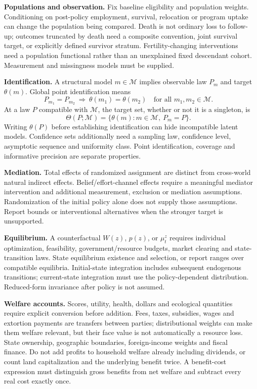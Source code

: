 \documentclass[11pt,a4paper]{article}
\begin{document}
\textbf{Populations and observation.} Fix baseline eligibility and population weights. Conditioning on post-policy employment, survival, relocation or program uptake can change the population being compared. Death is not ordinary loss to follow-up; outcomes truncated by death need a composite convention, joint survival target, or explicitly defined survivor stratum. Fertility-changing interventions need a population functional rather than an unexplained fixed descendant cohort. Measurement and missingness models must be supplied.

\textbf{Identification.} A structural model \(m\in\mathcal M\) implies observable law \(P_m\) and target \(\theta(m)\). Global point identification means
\[
 P_{m_1}=P_{m_2}\ \Longrightarrow\ \theta(m_1)=\theta(m_2)
 \quad\text{for all }m_1,m_2\in\mathcal M .
\]
At a law $P$ compatible with $\mathcal M$, the target set, whether or not it is a singleton, is
\[
 \Theta(P;\mathcal M)=\{\theta(m):m\in\mathcal M,\ P_m=P\}.
\]
Writing \(\theta(P)\) before establishing identification can hide incompatible latent models. Confidence sets additionally need a sampling law, confidence level, asymptotic sequence and uniformity class. Point identification, coverage and informative precision are separate properties.

\textbf{Mediation.} Total effects of randomized assignment are distinct from cross-world natural indirect effects. Belief/effort-channel effects require a meaningful mediator intervention and additional measurement, exclusion or mediation assumptions. Randomization of the initial policy alone does not supply those assumptions. Report bounds or interventional alternatives when the stronger target is unsupported.

\textbf{Equilibrium.} A counterfactual \(W(z)\), \(p(z)\), or \(\mu_t^z\) requires individual optimization, feasibility, government/resource budgets, market clearing and state-transition laws. State equilibrium existence and selection, or report ranges over compatible equilibria. Initial-state integration includes subsequent endogenous transitions; current-state integration must use the policy-dependent distribution. Reduced-form invariance after policy is not assumed.

\textbf{Welfare accounts.} Scores, utility, health, dollars and ecological quantities require explicit conversion before addition. Fees, taxes, subsidies, wages and extortion payments are transfers between parties; distributional weights can make them welfare relevant, but their face value is not automatically a resource loss. State ownership, geographic boundaries, foreign-income weights and fiscal finance. Do not add profits to household welfare already including dividends, or count land capitalization and the underlying benefit twice. A benefit-cost expression must distinguish gross benefits from net welfare and subtract every real cost exactly once.
\end{document}
